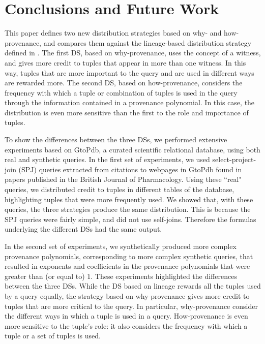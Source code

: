\section{Conclusions and Future Work}
\label{section:conclusions}

This paper 
defines two new distribution strategies based on why- and how-provenance, and compares them against the lineage-based distribution strategy defined in \cite{dosso2020data}. 
The first DS, based on why-provenance, uses the concept of a witness, and gives more credit to tuples that appear in more than one witness. 
In this way, tuples that are more important to the query and are used in different ways are rewarded more. %
The second DS, based on how-provenance, considers the frequency with which a tuple or combination of tuples is used in the query through the information contained in a provenance polynomial. In this case, the distribution is even more sensitive than the first to the role and importance of tuples.

To show the differences between the three DSs, we performed extensive experiments based on GtoPdb, a curated scientific relational database, using both real and synthetic queries. 
In the first set of experiments, we used select-project-join (SPJ) queries extracted from citations to webpages in GtoPdb found in papers published in the British Journal of Pharmacology. 
Using these ``real" queries, we distributed credit to tuples in different tables of the database, highlighting tuples that were more frequently used. 
We showed that, with these queries, the three strategies produce the same distribution. This is because the SPJ queries were fairly simple, and did not use self-joins. Therefore the formulas underlying the different DSs had the same output.

In the second set of experiments, we synthetically produced more complex provenance polynomials, corresponding to more complex synthetic queries, that resulted in exponents and coefficients in the provenance polynomials that were greater than (or equal to) $1$.
These experiments highlighted the differences between the three DSs.
While the DS based on lineage rewards all the tuples used by a query equally, the strategy based on why-provenance gives more credit to  tuples that are more critical to the query. 
In particular, why-provenance consider the different ways in which a tuple is used in a query.  
How-provenance is even more sensitive to the tuple's role: it also considers the frequency with which a tuple or a set of tuples is used. %

